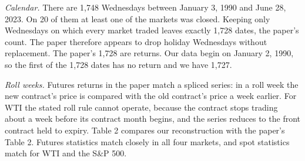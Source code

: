 \documentclass[11pt,letterpaper]{article}
\begin{document}
\textit{Calendar.} There are 1,748 Wednesdays between January 3, 1990 and June 28, 2023. On 20 of them at least one of the markets was closed. Keeping only Wednesdays on which every market traded leaves exactly 1,728 dates, the paper's count. The paper therefore appears to drop holiday Wednesdays without replacement. The paper's 1,728 are returns. Our data begin on January 2, 1990, so the first of the 1,728 dates has no return and we have 1,727.

\textit{Roll weeks.} Futures returns in the paper match a spliced series: in a roll week the new contract's price is compared with the old contract's price a week earlier. For WTI the stated roll rule cannot operate, because the contract stops trading about a week before its contract month begins, and the series reduces to the front contract held to expiry. Table 2 compares our reconstruction with the paper's Table 2. Futures statistics match closely in all four markets, and spot statistics match for WTI and the S\&P 500.
\end{document}
